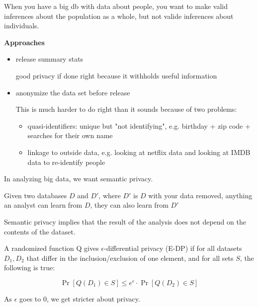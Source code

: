 
When you have a big db with data about people, you want to make valid inferences about the population as a whole, but not valide inferences about individuals.

\textbf{Approaches}
\begin{itemize}
	\item release summary stats
	
	good privacy if done right because it withholds useful information
	\item anonymize the data set before release
	
	This is much harder to do right than it sounds because of two problems:
	\begin{itemize}
		\item quasi-identifiers: unique but "not identifying", e.g. birthday + zip code + searches for their own name
		\item linkage to outside data, e.g. looking  at netflix data and looking at IMDB data to re-identify people
	\end{itemize}
\end{itemize}

In analyzing big data, we want semantic privacy. 
\begin{definition}
	Given two databases $D$ and $D'$, where $D'$ is $D$ with your data removed, anything an analyst can learn from $D$, they can also learn from $D'$
\end{definition}

\begin{theorem}
	Semantic privacy implies that the result of the analysis does not depend on the contents of the dataset.
\end{theorem}

\begin{definition}
	A randomized function Q gives $\epsilon$-differential privacy (E-DP) if for all datasets $D_1, D_2$ that differ in the inclusion/exclusion of one element, and for all sets $S$, the following is true:

	$$\Pr[Q(D_1) \in S] \leq e^\epsilon \cdot \Pr[Q(D_2) \in S]$$

	As $\epsilon$ goes to 0, we get stricter about privacy.
\end{definition}


